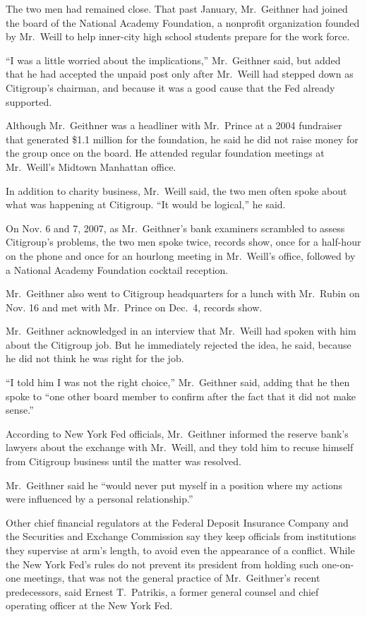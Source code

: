 \documentclass[12pt,a4paper,onecolumn]{article}
\begin{document}
The two men had remained close. That past January, Mr.~Geithner had joined the board of the National
Academy Foundation, a nonprofit organization founded by Mr.~Weill to help inner-city high school
students prepare for the work force.

``I was a little worried about the implications,'' Mr.~Geithner said, but added that he had accepted
the unpaid post only after Mr.~Weill had stepped down as Citigroup's chairman, and because it was a
good cause that the Fed already supported.

Although Mr.~Geithner was a headliner with Mr.~Prince at a 2004 fundraiser that generated \$1.1
million for the foundation, he said he did not raise money for the group once on the board. He
attended regular foundation meetings at Mr.~Weill's Midtown Manhattan office.

In addition to charity business, Mr.~Weill said, the two men often spoke about what was happening at
Citigroup. ``It would be logical,'' he said.

On Nov. 6 and 7, 2007, as Mr.~Geithner's bank examiners scrambled to assess Citigroup's problems,
the two men spoke twice, records show, once for a half-hour on the phone and once for an hourlong
meeting in Mr.~Weill's office, followed by a National Academy Foundation cocktail reception.

Mr.~Geithner also went to Citigroup headquarters for a lunch with Mr.~Rubin on Nov. 16 and met with
Mr.~Prince on Dec.~4, records show.

Mr.~Geithner acknowledged in an interview that Mr.~Weill had spoken with him about the Citigroup
job. But he immediately rejected the idea, he said, because he did not think he was right for the
job.

``I told him I was not the right choice,'' Mr.~Geithner said, adding that he then spoke to ``one
other board member to confirm after the fact that it did not make sense.''

According to New York Fed officials, Mr.~Geithner informed the reserve bank's lawyers about the
exchange with Mr.~Weill, and they told him to recuse himself from Citigroup business until the
matter was resolved.

Mr.~Geithner said he ``would never put myself in a position where my actions were influenced by a
personal relationship.''

Other chief financial regulators at the Federal Deposit Insurance Company and the Securities and
Exchange Commission say they keep officials from institutions they supervise at arm's length, to
avoid even the appearance of a conflict. While the New York Fed's rules do not prevent its president
from holding such one-on-one meetings, that was not the general practice of Mr.~Geithner's recent
predecessors, said Ernest T.~Patrikis, a former general counsel and chief operating officer at the
New York Fed.
\end{document}
